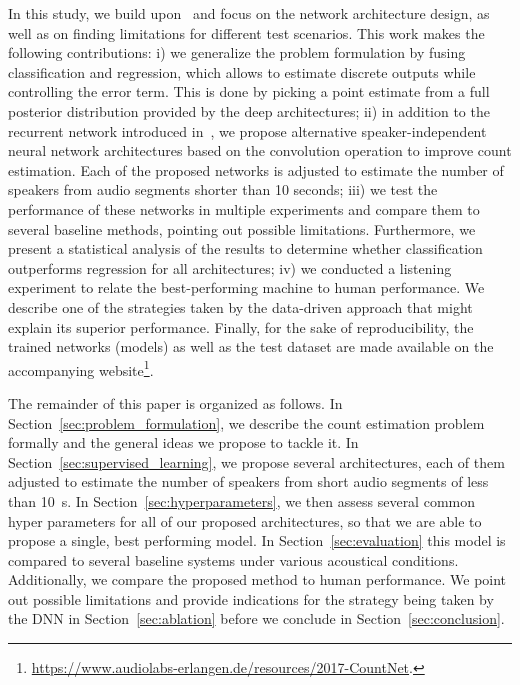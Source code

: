 In this study, we build upon~\cite{stoeter17} and focus on the network architecture design, as well as on finding limitations for different test scenarios.
This work makes the following contributions:
i) we generalize the problem formulation by fusing classification and regression, which allows to estimate discrete outputs while controlling the error term. This is done by picking a point estimate from a full posterior distribution provided by the deep architectures;
ii) in addition to the recurrent network introduced in~\cite{stoeter17}, we propose alternative speaker-independent neural network architectures based on the convolution operation to improve count estimation.
Each of the proposed networks is adjusted to estimate the number of speakers from audio segments shorter than 10 seconds;
iii) we test the performance of these networks in multiple experiments and compare them to several baseline methods, pointing out possible limitations.
Furthermore, we present a statistical analysis of the results to determine whether classification outperforms regression for all architectures;
iv) we conducted a listening experiment to relate the best-performing machine to human performance.
We describe one of the strategies taken by the data-driven approach that might explain its superior performance.
Finally, for the sake of reproducibility, the trained networks (models) as well as the test dataset are made available on the accompanying website\footnote{\url{https://www.audiolabs-erlangen.de/resources/2017-CountNet}.}.
\par
The remainder of this paper is organized as follows. In Section~\ref{sec:problem_formulation}, we describe the count estimation problem formally and the general ideas we propose to tackle it.
In Section~\ref{sec:supervised_learning}, we propose several architectures, each of them adjusted to estimate the number of speakers from short audio segments of less than 10~s.
In Section~\ref{sec:hyperparameters}, we then assess several common hyper parameters for all of our proposed architectures, so that we are able to propose a single, best performing model.
In Section~\ref{sec:evaluation} this model is compared to several baseline systems under various acoustical conditions.
Additionally, we compare the proposed method to human performance.
We point out possible limitations and provide indications for the strategy being taken by the DNN in Section~\ref{sec:ablation} before we conclude in Section~\ref{sec:conclusion}.
